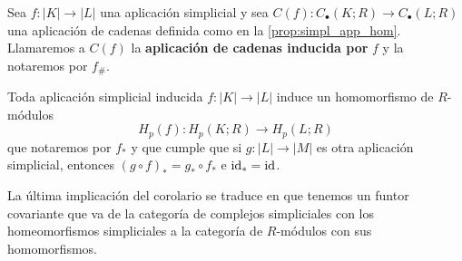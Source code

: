 \begin{definicion}
	\label{def:chain-map-ind} Sea \(f : |K| \to |L|\) una aplicación simplicial y sea
	\(C(f): C_{\bullet}(K;R) \to C_{\bullet}(L;R)\) una aplicación de cadenas definida
	como en la \autoref{prop:simpl_app_hom}. Llamaremos a \(C(f)\) la \textbf{aplicación
		de cadenas inducida por} \(f\) y la notaremos por \(f_{\#}\).
\end{definicion}

\begin{corolario}
	Toda aplicación simplicial inducida \(f: |K| \to |L|\) induce un homomorfismo de
	\(R\)-módulos
	\[
	H_{p}(f) : H_{p}(K;R) \to H_{p}(L;R)
	\]
	que notaremos por \(f_{*}\) y que cumple que si \(g: |L| \to |M|\) es otra aplicación
	simplicial, entonces \((g \circ f)_{*}= g_{*}\circ f_{*}\) e \(\operatorname{id}_{*}= \operatorname{id}\).
\end{corolario}
\begin{observacion}
	La última implicación del corolario se traduce en que tenemos un funtor covariante
	que va de la categoría de complejos simpliciales con los homeomorfismos simpliciales
	a la categoría de \(R\)-módulos con sus homomorfismos.
\end{observacion}

